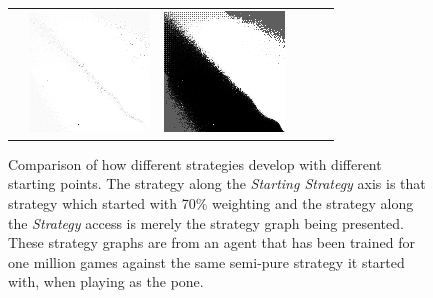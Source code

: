 \begin{figure}
\begin{tabular}{ l l l l l l }
		&\parbox[c]{1em}{\includegraphics[width=\stratgraphwidthmed]{images/findings/experiments/starting_points/matrix_handmaxmed_handmaxposs-7.png}}
		&\parbox[c]{1em}{\includegraphics[width=\stratgraphwidthmed]{images/findings/experiments/starting_points/matrix_handmaxmed_handmaxmed-7.png}}
	\\
\end{tabular}

\caption{
	Comparison of how different strategies develop with different
	starting points.
	The strategy along the \textit{Starting Strategy} axis is that strategy
	which started with 70\% weighting
	and the strategy along the \textit{Strategy} access is
	merely the strategy graph being presented.
	These strategy graphs are from an agent that has been trained for one
	million games
	against the same semi-pure strategy it started with,
	when playing as the pone.
}
\label{fig:findings-expts-sanitycheck-matrix}
\end{figure}
